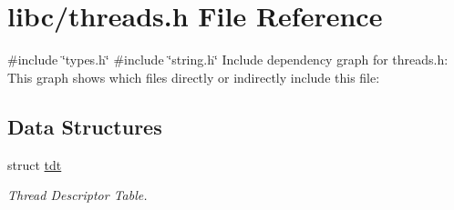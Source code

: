 \hypertarget{a00065}{}\section{libc/threads.h File Reference}
\label{a00065}
{\ttfamily \#include \char`\"{}types.\+h\char`\"{}}\newline
{\ttfamily \#include \char`\"{}string.\+h\char`\"{}}\newline
Include dependency graph for threads.\+h\+:
This graph shows which files directly or indirectly include this file\+:
\subsection*{Data Structures}
\begin{DoxyCompactItemize}
\item 
struct \hyperlink{a00107}{tdt}
\begin{DoxyCompactList}\small\item\em Thread Descriptor Table. \end{DoxyCompactList}\end{DoxyCompactItemize}
